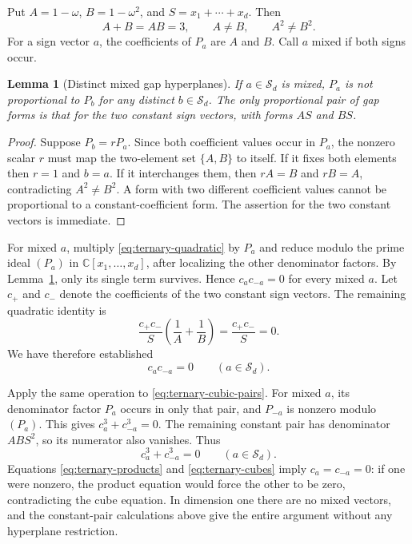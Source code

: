 \documentclass[11pt,a4paper]{article}
\newtheorem{lemma}{Lemma}[section]
\theoremstyle{definition}
\theoremstyle{remark}\newtheorem{remark}[lemma]{Remark}
\newcommand{\C}{\mathbb C}\newcommand{\F}{\mathbb F}
\begin{document}
Put $A=1-\omega$, $B=1-\omega^2$, and $S=x_1+\cdots+x_d$. Then
\[
 A+B=AB=3,\qquad A\ne B,\qquad A^2\ne B^2.
\]
For a sign vector $a$, the coefficients of $P_a$ are $A$ and $B$.
Call $a$ mixed if both signs occur.

\begin{lemma}[Distinct mixed gap hyperplanes]\label{lem:mixed-gaps}
If $a\in\mathcal S_d$ is mixed, $P_a$ is not proportional to $P_b$ for
any distinct $b\in\mathcal S_d$. The only proportional pair of gap forms
is that for the two constant sign vectors, with forms $AS$ and $BS$.
\end{lemma}
\begin{proof}
Suppose $P_b=rP_a$. Since both coefficient values occur in $P_a$, the
nonzero scalar $r$ must map the two-element set $\{A,B\}$ to itself.
If it fixes both elements then $r=1$ and $b=a$. If it interchanges them,
then $rA=B$ and $rB=A$, contradicting $A^2\ne B^2$. A form with two
different coefficient values cannot be proportional to a constant-coefficient
form. The assertion for the two constant vectors is immediate.
\end{proof}

For mixed $a$, multiply \eqref{eq:ternary-quadratic} by $P_a$ and reduce
modulo the prime ideal $(P_a)$ in $\C[x_1,\ldots,x_d]$, after localizing
the other denominator factors. By Lemma~\ref{lem:mixed-gaps}, only its
single term survives. Hence $c_ac_{-a}=0$ for every mixed $a$.
Let $c_+$ and $c_-$ denote the coefficients of the two constant sign
vectors. The remaining quadratic identity is
\[
 \frac{c_+c_-}{S}\left(\frac1A+\frac1B\right)
      =\frac{c_+c_-}{S}=0.
\]
We have therefore established
\begin{equation}\label{eq:ternary-products}
 c_ac_{-a}=0\qquad(a\in\mathcal S_d).
\end{equation}

Apply the same operation to \eqref{eq:ternary-cubic-pairs}. For mixed
$a$, its denominator factor $P_a$ occurs in only that pair, and $P_{-a}$
is nonzero modulo $(P_a)$. This gives $c_a^3+c_{-a}^3=0$.
The remaining constant pair has denominator $AB S^2$, so its numerator
also vanishes. Thus
\begin{equation}\label{eq:ternary-cubes}
 c_a^3+c_{-a}^3=0\qquad(a\in\mathcal S_d).
\end{equation}
Equations \eqref{eq:ternary-products} and \eqref{eq:ternary-cubes} imply
$c_a=c_{-a}=0$: if one were nonzero, the product equation would force
the other to be zero, contradicting the cube equation. In dimension one
there are no mixed vectors, and the constant-pair calculations above give
the entire argument without any hyperplane restriction.
\end{document}
